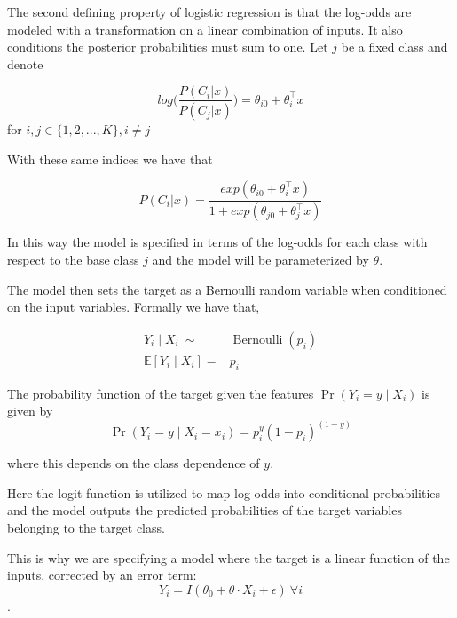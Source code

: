 
The second defining property of logistic regression is that the log-odds are modeled with a transformation on a linear combination of inputs. It also conditions the posterior probabilities must sum to one. Let $j$ be a fixed class and denote

\begin{equation}
 log\big( \frac{P(C_i|x)}{P(C_j|x)}\big) = \theta_{i0}  + \theta_i^\intercal x  
 \end{equation}  \label{logit-logOddss} for $i,j \in \{1,2,...,K\}, i\neq j$

With these same indices we have that

\begin{equation} P(C_i|x) = \frac{ exp(\theta_{i0}  + \theta_i^\intercal x)}{1 + exp(\theta_{j0}  + \theta_j^\intercal x)} 
\end{equation}

In this way the model is specified in terms of the log-odds for each class with respect to the base class $j$ and the model will be parameterized by $\theta$.

The model then sets the target as a Bernoulli random variable when conditioned on the input variables. Formally we have that,

\begin{equation}
\begin{split}
Y_i \mid X_i \  \sim & \operatorname{Bernoulli}(p_i) \\
\mathbb{E}[Y_i \mid X_i ] = & p_i
\end{split}
\end{equation}


The probability function of the target given the features $\Pr(Y_i=y\mid X_i)$ is given by
\begin{equation}
\Pr(Y_i=y \mid X_i = x_i) = p_i^{y} (1-p_i)^{(1-y)}
\end{equation}\label{logit-probabilityDensity}

where this depends on the class dependence of $y$.

Here the logit function is utilized to map log odds into conditional probabilities and the model outputs the predicted probabilities of the target variables belonging to the target class.

This is why we are specifying a model where the target is a linear function of the inputs, corrected by an error term:
\begin{equation}
Y_i = I(\theta_0 + \theta \cdot X_i + \epsilon) \ \forall i
\end{equation}. \label{logit-indicatorFunction}

